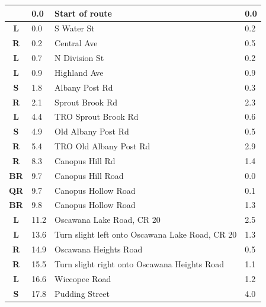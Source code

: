 \documentclass[11pt]{article}
\begin{document}
\renewcommand{\arraystretch}{1.15}
\twocolumn
{}
\tabletail{\hline}
\tablelasttail{\hline}
\begin{center}
  \begin{supertabular}{|c|p{0.30in}|p{2.25in}|l|}
  \hline
{} \textbf{} &   0.0 & Start of route &   0.0 \\ \hline
 \textbf{L} &   0.0 & S Water St &   0.2 \\ \hline
{} \textbf{R} &   0.2 & Central Ave &   0.5 \\ \hline
 \textbf{L} &   0.7 & N Division St &   0.2 \\ \hline
 \textbf{L} &   0.9 & Highland Ave &   0.9 \\ \hline
 \textbf{S} &   1.8 & Albany Post Rd &   0.3 \\ \hline
{} \textbf{R} &   2.1 & Sprout Brook Rd &   2.3 \\ \hline
 \textbf{L} &   4.4 & TRO Sprout Brook Rd &   0.6 \\ \hline
 \textbf{S} &   4.9 & Old Albany Post Rd &   0.5 \\ \hline
{} \textbf{R} &   5.4 & TRO Old Albany Post Rd &   2.9 \\ \hline
{} \textbf{R} &   8.3 & Canopus Hill Rd &   1.4 \\ \hline
{} \textbf{BR} &   9.7 & Canopus Hill Road &   0.0 \\ \hline
{} \textbf{QR} &   9.7 & Canopus Hollow Road &   0.1 \\ \hline
{} \textbf{BR} &   9.8 & Canopus Hollow Road &   1.3 \\ \hline
 \textbf{L} &  11.2 & Oscawana Lake Road, CR 20 &   2.5 \\ \hline
 \textbf{L} &  13.6 & Turn slight left onto Oscawana Lake Road, CR 20 &   1.3 \\ \hline
{} \textbf{R} &  14.9 & Oscawana Heights Road &   0.5 \\ \hline
{} \textbf{R} &  15.5 & Turn slight right onto Oscawana Heights Road &   1.1 \\ \hline
 \textbf{L} &  16.6 & Wiccopee Road &   1.2 \\ \hline
 \textbf{S} &  17.8 & Pudding Street &   4.0 \\ \hline

\end{supertabular}
\end{center}
\end{document}
